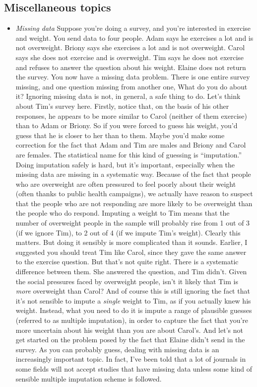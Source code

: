 \documentclass[
]{book}
\providecommand{\tightlist}{%
  \setlength{\itemsep}{0pt}\setlength{\parskip}{0pt}}
\begin{document}
\hypertarget{miscellaneous-topics}{%
\subsection{Miscellaneous topics}\label{miscellaneous-topics}}

\begin{itemize}
\tightlist
\item
  \emph{Missing data} Suppose you're doing a survey, and you're interested in exercise and weight. You send data to four people. Adam says he exercises a lot and is not overweight. Briony says she exercises a lot and is not overweight. Carol says she does not exercise and is overweight. Tim says he does not exercise and refuses to answer the question about his weight. Elaine does not return the survey. You now have a missing data problem. There is one entire survey missing, and one question missing from another one, What do you do about it? Ignoring missing data is not, in general, a safe thing to do. Let's think about Tim's survey here. Firstly, notice that, on the basis of his other responses, he appears to be more similar to Carol (neither of them exercise) than to Adam or Briony. So if you were forced to guess his weight, you'd guess that he is closer to her than to them. Maybe you'd make some correction for the fact that Adam and Tim are males and Briony and Carol are females. The statistical name for this kind of guessing is ``imputation.'' Doing imputation safely is hard, but it's important, especially when the missing data are missing in a systematic way. Because of the fact that people who are overweight are often pressured to feel poorly about their weight (often thanks to public health campaigns), we actually have reason to suspect that the people who are not responding are more likely to be overweight than the people who do respond. Imputing a weight to Tim means that the number of overweight people in the sample will probably rise from 1 out of 3 (if we ignore Tim), to 2 out of 4 (if we impute Tim's weight). Clearly this matters. But doing it sensibly is more complicated than it sounds. Earlier, I suggested you should treat Tim like Carol, since they gave the same answer to the exercise question. But that's not quite right. There is a systematic difference between them. She answered the question, and Tim didn't. Given the social pressures faced by overweight people, isn't it likely that Tim is \emph{more} overweight than Carol? And of course this is still ignoring the fact that it's not sensible to impute a \emph{single} weight to Tim, as if you actually knew his weight. Instead, what you need to do it is impute a range of plausible guesses (referred to as multiple imputation), in order to capture the fact that you're more uncertain about his weight than you are about Carol's. And let's not get started on the problem posed by the fact that Elaine didn't send in the survey. As you can probably guess, dealing with missing data is an increasingly important topic. In fact, I've been told that a lot of journals in some fields will not accept studies that have missing data unless some kind of sensible multiple imputation scheme is followed.\\

\end{itemize}
\end{document}
